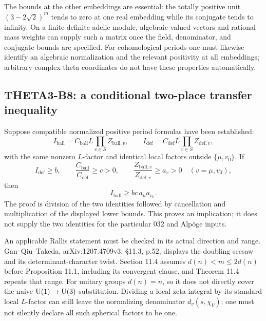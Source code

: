 \documentclass[11pt]{article}
\theoremstyle{definition}\newtheorem{definition}[theorem]{Definition}\newtheorem{remark}[theorem]{Remark}
\begin{document}
The bounds at the other embeddings are essential: the totally positive unit $(3-2\sqrt2)^m$ tends to zero at one real embedding while its conjugate tends to infinity. On a finite definite adelic module, algebraic-valued vectors and rational mass weights can supply such a matrix once the field, denominator, and conjugate bounds are specified. For cohomological periods one must likewise identify an algebraic normalization and the relevant positivity at all embeddings; arbitrary complex theta coordinates do not have these properties automatically.

\subsection{THETA3-B8: a conditional two-place transfer inequality}\label{B8}

Suppose compatible normalized positive period formulas have been established:
\[
 I_{\mathrm{ball}}=C_{\mathrm{ball}}L\prod_{v\in S}Z_{\mathrm{ball},v},
 \qquad
 I_{\mathrm{def}}=C_{\mathrm{def}}L\prod_{v\in S}Z_{\mathrm{def},v},
\]
with the same nonzero $L$-factor and identical local factors outside
$\{\mu,v_0\}$. If
\[
 I_{\mathrm{def}}\geq b,\qquad
 \frac{C_{\mathrm{ball}}}{C_{\mathrm{def}}}\geq c>0,
 \qquad \frac{Z_{\mathrm{ball},v}}{Z_{\mathrm{def},v}}\geq a_v>0
 \quad(v=\mu,v_0),
\]
then
\[
 I_{\mathrm{ball}}\geq bc\,a_\mu a_{v_0}.
\]
The proof is division of the two identities followed by cancellation and multiplication of the displayed lower bounds. This proves an implication; it does not supply the two identities for the particular 032 and Alp\"oge inputs.

An applicable Rallis statement must be checked in its actual direction and range. Gan--Qiu--Takeda, arXiv:1207.4709v3, \S11.3, p.52, displays the doubling seesaw and its determinant-character twist. Section 11.4 assumes $d(n)<m\leq2d(n)$ before Proposition 11.1, including its convergent clause, and Theorem 11.4 repeats that range. For unitary groups $d(n)=n$, so it does not directly cover the naive $\operatorname{U}(1)\to\operatorname{U}(3)$ substitution. Dividing a local zeta integral by its standard local $L$-factor can still leave the normalizing denominator $d_v(s,\chi_V)$; one must not silently declare all such spherical factors to be one.
\end{document}
